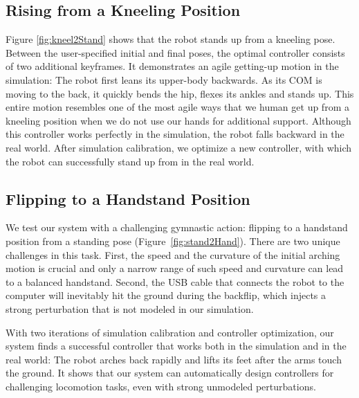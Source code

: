 \subsection{Rising from a Kneeling Position}

Figure \ref{fig:kneel2Stand} shows that the robot stands up from a kneeling pose. Between the user-specified initial and final poses, the optimal controller consists of two additional keyframes. It demonstrates an agile getting-up motion in the simulation: The robot first leans its upper-body backwards. As its COM is moving to the back, it quickly bends the hip, flexes its ankles and stands up. This entire motion resembles one of the most agile ways that we human get up from a kneeling position when we do not use our hands for additional support. Although this controller works perfectly in the simulation, the robot falls backward in the real world. After simulation calibration, we optimize a new controller, with which the robot can successfully stand up from in the real world.

\subsection{Flipping to a Handstand Position}
We test our system with a challenging gymnastic action: flipping to a handstand position from a standing pose (Figure~\ref{fig:stand2Hand}). There are two unique challenges in this task. First, the speed and the curvature of the initial arching motion is crucial and only a narrow range of such speed and curvature can lead to a balanced handstand. Second, the USB cable that connects the robot to the computer will inevitably hit the ground during the backflip, which injects a strong perturbation that is not modeled in our simulation.

With two iterations of simulation calibration and controller optimization, our system finds a successful controller that works both in the simulation and in the real world: The robot arches back rapidly and lifts its feet after the arms touch the ground. It shows that our system can automatically design controllers for challenging locomotion tasks, even with strong unmodeled perturbations.

